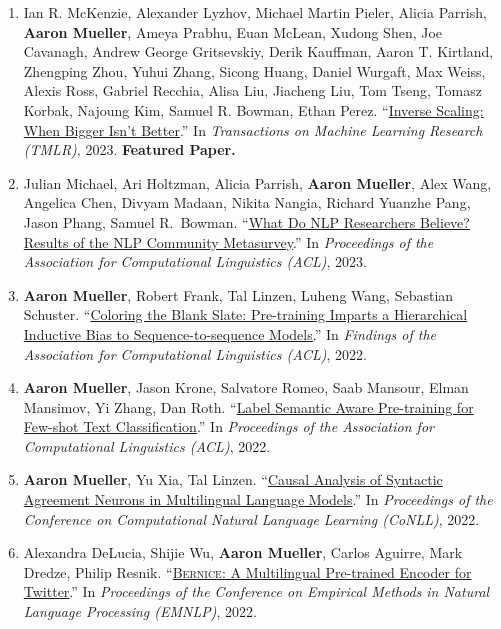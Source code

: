 \documentclass[10pt]{article}
\providecommand*\titlelink[2]{\href{#1}{\textcolor{accent}{#2}}}
\begin{document}
\begin{enumerate}[leftmargin=*, topsep=0pt, itemsep=0.25ex, partopsep=0ex, parsep=1ex]
	\item Ian R. McKenzie, Alexander Lyzhov, Michael Martin Pieler, Alicia Parrish, \textbf{Aaron Mueller}, Ameya Prabhu, Euan McLean, Xudong Shen, Joe Cavanagh, Andrew George Gritsevskiy, Derik Kauffman, Aaron T. Kirtland, Zhengping Zhou, Yuhui Zhang, Sicong Huang, Daniel Wurgaft, Max Weiss, Alexis Ross, Gabriel Recchia, Alisa Liu, Jiacheng Liu, Tom Tseng, Tomasz Korbak, Najoung Kim, Samuel R. Bowman, Ethan Perez. ``\titlelink{https://arxiv.org/abs/2306.09479}{Inverse Scaling: When Bigger Isn't Better}.'' In \emph{Transactions on Machine Learning Research (TMLR)}, 2023. \textbf{\textcolor{accent}{Featured Paper.}}

	\item Julian Michael, Ari Holtzman, Alicia Parrish, \textbf{Aaron Mueller}, Alex Wang, Angelica Chen, Divyam Madaan, Nikita Nangia, Richard Yuanzhe Pang, Jason Phang, Samuel R.\ Bowman. ``\titlelink{https://arxiv.org/abs/2208.12852}{What Do NLP Researchers Believe? Results of the NLP Community Metasurvey}.'' In \emph{Proceedings of the Association for Computational Linguistics (ACL)}, 2023.
	
	\item \textbf{Aaron Mueller}, Robert Frank, Tal Linzen, Luheng Wang, Sebastian Schuster. ``\titlelink{https://aclanthology.org/2022.findings-acl.106.pdf}{Coloring the Blank Slate: Pre-training Imparts a Hierarchical Inductive Bias to Sequence-to-sequence Models}.'' In \emph{Findings of the Association for Computational Linguistics (ACL)}, 2022.

	\item \textbf{Aaron Mueller}, Jason Krone, Salvatore Romeo, Saab Mansour, Elman Mansimov, Yi Zhang, Dan Roth. ``\titlelink{https://aclanthology.org/2022.acl-long.570/}{Label Semantic Aware Pre-training for Few-shot Text Classification}.'' In \emph{Proceedings of the Association for Computational Linguistics (ACL)}, 2022.\label{pub:lsap}
	
	\item \textbf{Aaron Mueller}, Yu Xia, Tal Linzen. ``\titlelink{https://arxiv.org/abs/2210.14328}{Causal Analysis of Syntactic Agreement Neurons in Multilingual Language Models}.'' In \emph{Proceedings of the Conference on Computational Natural Language Learning (CoNLL)}, 2022.\label{pub:causal-multiling}
	
	\item Alexandra DeLucia, Shijie Wu, \textbf{Aaron Mueller}, Carlos Aguirre, Mark Dredze, Philip Resnik. ``\titlelink{https://preview.aclanthology.org/emnlp-22-ingestion/2022.emnlp-main.415/}{\textsc{Bernice}: A Multilingual Pre-trained Encoder for Twitter}.'' In \emph{Proceedings of the Conference on Empirical Methods in Natural Language Processing (EMNLP)}, 2022.
			

\end{enumerate}
\end{document}
